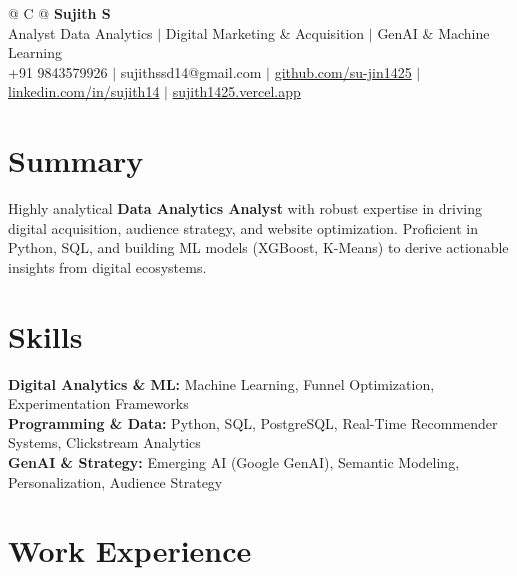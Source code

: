 \documentclass[a4paper,10pt]{article}
\newcommand{\ulink}[2]{\href{#1}{#2}}
\begin{document}
\pagestyle{empty}

\begin{tabularx}{\linewidth}{@{} C @{}}
{\color[HTML]{000000}\fontsize{30}{35}\selectfont\bfseries Sujith S} \\[5pt]
{\fontsize{10.5}{12.5}\selectfont\color[HTML]{3A3A3A}
Analyst Data Analytics $|$ Digital Marketing \& Acquisition $|$ GenAI \& Machine Learning} \\[6pt]
{\fontsize{9.5}{11.5}\selectfont\textcolor[HTML]{3A3A3A}{+91 9843579926 $|$ sujithssd14@gmail.com $|$ \ulink{https://github.com/su-jin1425}{github.com/su-jin1425} $|$ \ulink{https://linkedin.com/in/sujith14}{linkedin.com/in/sujith14} $|$ \ulink{https://sujith1425.vercel.app}{sujith1425.vercel.app}}}
\end{tabularx}

\section{Summary}
\vspace{2pt}

{\color[HTML]{0A0A0A}\fontsize{11}{14}\selectfont
Highly analytical \textbf{Data Analytics Analyst} with robust expertise in driving digital acquisition, audience strategy, and website optimization. Proficient in Python, SQL, and building ML models (XGBoost, K-Means) to derive actionable insights from digital ecosystems.}

\section{Skills}
\vspace{2pt}

{\color[HTML]{0A0A0A}\fontsize{11}{14}\selectfont
\textbf{Digital Analytics \& ML:} Machine Learning, Funnel Optimization, Experimentation Frameworks \\[2pt]
\textbf{Programming \& Data:} Python, SQL, PostgreSQL, Real-Time Recommender Systems, Clickstream Analytics \\[2pt]
\textbf{GenAI \& Strategy:} Emerging AI (Google GenAI), Semantic Modeling, Personalization, Audience Strategy}

\section{Work Experience}
\vspace{2pt}
\end{document}

